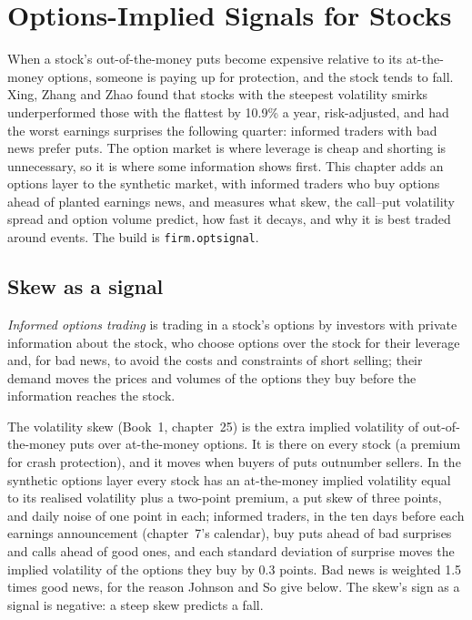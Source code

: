 \chapter{Options-Implied Signals for Stocks}\label{ch:s1:options-implied-signals-for-stocks}

When a stock's out-of-the-money puts become expensive relative to its at-the-money options, someone is paying up for protection, and the stock tends to fall.
Xing, Zhang and Zhao found that stocks with the steepest volatility smirks underperformed those with the flattest by 10.9\% a year, risk-adjusted, and had
the worst earnings surprises the following quarter: informed traders with bad news prefer puts. The option market is where leverage is cheap and shorting is
unnecessary, so it is where some information shows first. This chapter adds an options layer to the synthetic market, with informed traders who buy options
ahead of planted earnings news, and measures what skew, the call--put volatility spread and option volume predict, how fast it decays, and why it is best
traded around events. The build is \texttt{firm.optsignal}.

\section{Skew as a signal}

\begin{definition}\label{def:s1:options-implied-signals-for-stocks:informed}
\emph{Informed options trading} is trading in a stock's options by investors with private information about the stock, who
choose options over the stock for their leverage and, for bad news, to avoid the costs and constraints of short selling; their demand moves the prices and
volumes of the options they buy before the information reaches the stock.
\end{definition}

The volatility skew (Book~1, chapter~25) is the extra implied volatility of out-of-the-money puts over at-the-money options. It is there on every stock (a
premium for crash protection), and it moves when buyers of puts outnumber sellers. In the synthetic options layer every stock has an at-the-money implied
volatility equal to its realised volatility plus a two-point premium, a put skew of three points, and daily noise of one point in each; informed traders,
in the ten days before each earnings announcement (chapter~7's calendar), buy puts ahead of bad surprises and calls ahead of good ones, and each
standard deviation of surprise moves the implied volatility of the options they buy by 0.3 points. Bad news is weighted 1.5 times good news, for the reason
Johnson and So give below. The skew's sign as a signal is negative: a steep skew predicts a fall.

